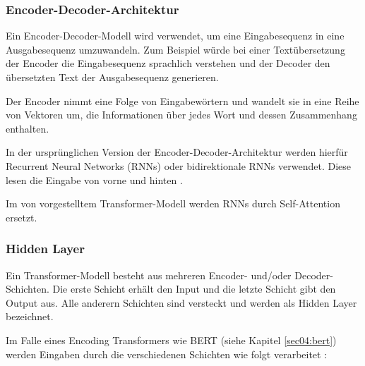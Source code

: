 \subsubsection{Encoder-Decoder-Architektur} \label{sec:encoder_decoder_architecture}

Ein Encoder-Decoder-Modell wird verwendet, um eine Eingabesequenz in eine Ausgabesequenz umzuwandeln. 
Zum Beispiel würde bei einer Textübersetzung der Encoder die Eingabesequenz sprachlich verstehen und der Decoder den übersetzten Text der Ausgabesequenz generieren.

Der Encoder nimmt eine Folge von Eingabewörtern und wandelt sie in eine Reihe von Vektoren um, die Informationen über jedes Wort und dessen Zusammenhang enthalten.

In der ursprünglichen Version der Encoder-Decoder-Architektur werden hierfür Recurrent Neural Networks (RNNs) oder bidirektionale RNNs verwendet.
Diese lesen die Eingabe von vorne und hinten \cite{bahdanau2016neuralmachinetranslationjointly}.

Im von \cite{vaswani2023attentionneed} vorgestelltem Transformer-Modell werden RNNs durch Self-Attention ersetzt. 


\subsubsection{Hidden Layer} \label{sec:hidden_layer}

Ein Transformer-Modell \cite{vaswani2023attentionneed} besteht aus mehreren Encoder- und/oder Decoder-Schichten.
Die erste Schicht erhält den Input und die letzte Schicht gibt den Output aus. Alle anderern Schichten sind versteckt und werden
als Hidden Layer bezeichnet.

Im Falle eines Encoding Transformers wie BERT (siehe Kapitel \ref{sec04:bert}) werden Eingaben durch die verschiedenen Schichten wie folgt verarbeitet \cite{DBLP:journals/corr/abs-1810-04805}:

